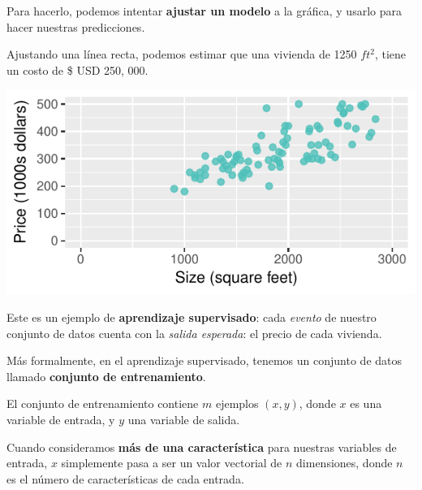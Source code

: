 \documentclass[twoside,twocolumn]{article}
\begin{document}
        Para hacerlo, podemos intentar \textbf{ajustar un modelo} a la gráfica,
        y usarlo para hacer nuestras predicciones.

        Ajustando una línea recta, podemos estimar que una vivienda de
        1250 $ft^2$, tiene un costo de \$ USD 250, 000.

        \includegraphics[width=\columnwidth, page = 3]{housePrices.pdf}
        
        Este es un ejemplo de \textbf{aprendizaje supervisado}: cada
        \textit{evento} de nuestro conjunto de datos cuenta con la 
        \textit{salida esperada}: el precio de cada vivienda.

        Más formalmente, en el aprendizaje supervisado, tenemos un conjunto
        de datos llamado \textbf{conjunto de entrenamiento}.

        El conjunto de entrenamiento contiene $m$ ejemplos $(x, y)$, donde
        $x$ es una variable de entrada, y $y$ una variable de salida.

        Cuando consideramos \textbf{más de una característica} para nuestras
        variables de entrada, $x$ simplemente pasa a ser un valor vectorial 
        de $n$ dimensiones, donde $n$ es el número de características de cada
        entrada.



  

  

  
  
  
  
\end{document}
